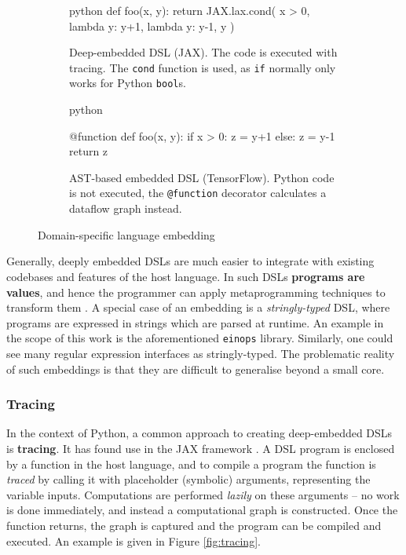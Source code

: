 \begin{figure}
\centering
\begin{subfigure}{.4\textwidth}
  \centering
  \begin{cminted}{python}
def foo(x, y):
  return JAX.lax.cond(
    x > 0, 
    lambda y: y+1, 
    lambda y: y-1, 
    y
  )
  \end{cminted}
  \caption{Deep-embedded DSL (JAX). The code is executed with tracing. The \texttt{cond} function is used, as \texttt{if} normally only works for Python \texttt{bool}s.}
\end{subfigure} \quad %
\begin{subfigure}{.4\textwidth}
  \centering
    \begin{cminted}{python}

@function
def foo(x, y):
  if x > 0: z = y+1
  else:     z = y-1
  return z

    \end{cminted}
      \caption{AST-based embedded DSL (TensorFlow). Python code is not executed, the \texttt{@function} decorator calculates a dataflow graph instead.}
\end{subfigure}
\caption{Domain-specific language embedding}
\label{fig:embeddings}
\end{figure}

Generally, deeply embedded DSLs are much easier to integrate with existing codebases and features of the host language.
In such DSLs \textbf{programs are values}, and hence the programmer can apply metaprogramming techniques to transform them \cite{atkey2009unembedding}. 
A special case of an embedding is a \textit{stringly-typed} DSL, where programs are expressed in strings which are parsed at runtime. An example in the scope of this work is the aforementioned \texttt{einops} library.  Similarly, one could see many regular expression interfaces as stringly-typed. The problematic reality of such embeddings is that they are difficult to generalise beyond a small core.

\subsubsection{Tracing} \label{tracing}

In the context of Python, a common approach to creating deep-embedded DSLs is \textbf{tracing}. It has found use in the JAX framework \cite{frostig2018compiling}. A DSL program is enclosed by a function in the host language, and to compile a program the function is \textit{traced} by calling it with placeholder (symbolic) arguments, representing the variable inputs. Computations are performed \textit{lazily} on these arguments -- no work is done immediately, and instead a computational graph is constructed. Once the function returns, the graph is captured and the program can be compiled and executed. An example is given in Figure \ref{fig:tracing}.

